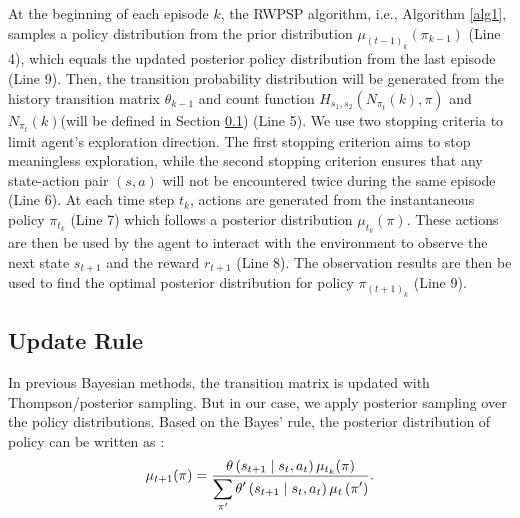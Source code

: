 \documentclass{article}
\theoremstyle{plain}
\theoremstyle{definition}
\theoremstyle{remark}
\begin{document}

At the beginning of each episode $k$, the RWPSP algorithm, i.e., Algorithm \ref{alg1}, samples a policy distribution from the prior distribution $\mu_{(t-1)_{k}}(\pi_{k-1})$ (Line 4), which equals the updated posterior policy distribution from the last episode (Line 9). Then, the transition probability distribution will be generated from the history transition matrix $\theta_{k-1}$ and count function $H_{s_{1},s_{2}}(N_{\pi_{t}}(k),\pi)$ and $N_{\pi_{t}}(k)$(will be defined in Section \ref{section4}) (Line 5). We use two stopping criteria to limit agent's exploration direction. The first stopping criterion aims to stop meaningless exploration, while the second stopping criterion ensures that any state-action pair $(s,a)$ will not be encountered twice during the same episode (Line 6).  At each time step $t_{k}$, actions are generated from the instantaneous policy $\pi_{t_{k}}$ (Line 7) which follows a posterior distribution $\mu_{t_{k}}(\pi)$. These actions are then be used by the agent to interact with the environment to observe the next state $s_{t+1}$ and the reward $r_{t+1}$ (Line 8). The observation results are then be used to find the optimal posterior distribution for policy $\pi_{(t+1)_{k}}$ (Line 9). 

\subsection{Update Rule}
\label{section4}
In previous Bayesian methods, the transition matrix is updated with Thompson/posterior sampling. But in our case, we apply posterior sampling over the policy distributions. Based on the Bayes' rule, the posterior distribution of policy can be written as :
\begin{equation}
\centering
\mu_{t+1}(\pi)=\frac{\theta\left(s_{t+1} \mid s_{t}, a_{t}\right) \mu_{t_{k}}(\pi)}{\displaystyle\sum_{\pi^{\prime}} \theta^{\prime}\left(s_{t+1} \mid s_{t}, a_{t}\right) \mu_{t}\left(\pi^{\prime}\right)}.
\end{equation}
\end{document}

